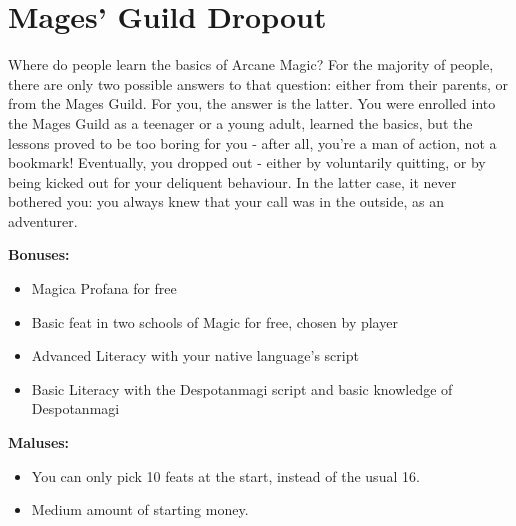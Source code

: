\section{Mages' Guild Dropout}
Where do people learn the basics of Arcane Magic? For the majority of people, there are only two possible answers to that question: either from their parents, or from the Mages Guild. For you, the answer is the latter. You were enrolled into the Mages Guild as a teenager or a young adult, learned the basics, but the lessons proved to be too boring for you - after all, you're a man of action, not a bookmark! Eventually, you dropped out - either by voluntarily quitting, or by being kicked out for your deliquent behaviour. In the latter case, it never bothered you: you always knew that your call was in the outside, as an adventurer. 


\textbf{Bonuses:}
\begin{itemize}
	\item Magica Profana for free
	\item Basic feat in two schools of Magic for free, chosen by player
	\item Advanced Literacy with your native language's script
	\item Basic Literacy with the Despotanmagi script and basic knowledge of Despotanmagi 
\end{itemize}
\textbf{Maluses:}
\begin{itemize}
	\item You can only pick 10 feats at the start, instead of the usual 16.
	\item Medium amount of starting money.
\end{itemize}
